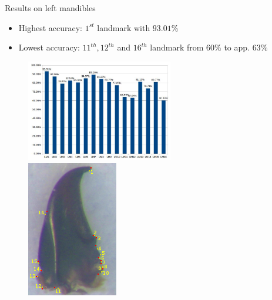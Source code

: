 \documentclass{LaBRI_poster}
\begin{document}
\begin{frame}[t]
\begin{columns}[t]
\begin{column}{\twocolwidth}
\begin{block}{Results on left mandibles}
	\begin{itemize}
  		\item Highest accuracy: $1^{st}$ landmark with \textbf{$93.01\%$}
  		\item Lowest accuracy: $11^{th}, 12^{th}$ and $16^{th}$ landmark from  $60\%$ to app. $63\%$
  	\end{itemize}
  	\begin{figure}
		\includegraphics[width=0.6\textwidth]{images/mg_chartlms}~~
		\includegraphics[scale=1.9]{images/mg_rs}
	\end{figure}
\end{block}

\end{column}

\begin{column}{\sepwidth}\end{column}
\end{columns}



\begin{columns}[t] 

\begin{column}{\sepwidth}\end{column} %


\end{columns}
\end{frame}
\end{document}
